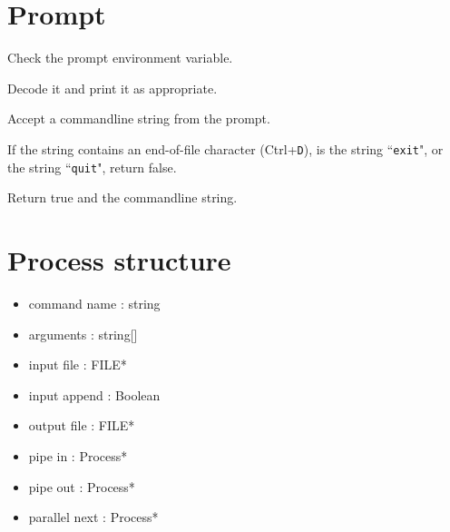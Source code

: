 \documentclass{article}
\begin{document}
\section{Prompt}
\begin{deepenum}
    \item
        Check the prompt environment variable.
    \item
        Decode it and print it as appropriate.
    \item
        Accept a commandline string from the prompt.
    \item
        If the string contains an end-of-file character (Ctrl+\texttt{D}), is the string ``\texttt{exit}", or the string ``\texttt{quit}", return false.
    \item
        Return true and the commandline string.
\end{deepenum}

\section{Process structure}
\begin{itemize}
    \item
        command name : string
    \item
        arguments : string[]
    \item
        input file : FILE*
    \item
        input append : Boolean
    \item
        output file : FILE*
    \item
        pipe in : Process*
    \item
        pipe out : Process*
    \item
        parallel next : Process*
\end{itemize}
\end{document}
